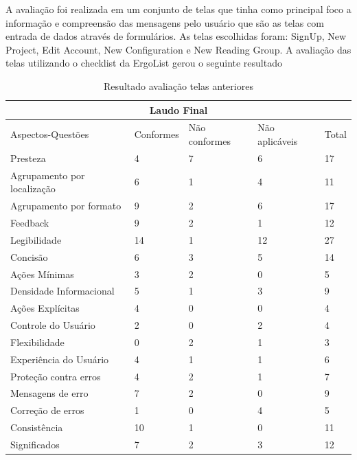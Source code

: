 A avaliação foi realizada em um conjunto de telas que tinha como principal foco a informação e compreensão das mensagens pelo usuário que são as telas com entrada de dados através de formulários. As telas escolhidas foram: SignUp, New Project, Edit Account, New Configuration e New Reading Group. A avaliação das telas utilizando o checklist da ErgoList gerou o seguinte resultado

\begin{table}[H]
\begin{tabular}{|l|l|l|l|l|}
\hline
\multicolumn{5}{c}{\textbf{Laudo Final}}                                         \\ \hline
Aspectos-Questões           & Conformes & Não conformes & Não aplicáveis & Total \\ \hline
Presteza                    & 4         & 7             & 6              & 17    \\ \hline
Agrupamento por localização & 6         & 1             & 4              & 11    \\ \hline
Agrupamento por formato     & 9         & 2             & 6              & 17    \\ \hline
Feedback                    & 9         & 2             & 1              & 12    \\ \hline
Legibilidade                & 14        & 1             & 12             & 27    \\ \hline
Concisão                    & 6         & 3             & 5              & 14    \\ \hline
Ações Mínimas               & 3         & 2             & 0              & 5     \\ \hline
Densidade Informacional     & 5         & 1             & 3              & 9     \\ \hline
Ações Explícitas            & 4         & 0             & 0              & 4     \\ \hline
Controle do Usuário         & 2         & 0             & 2              & 4     \\ \hline
Flexibilidade               & 0         & 2             & 1              & 3     \\ \hline
Experiência do Usuário      & 4         & 1             & 1              & 6     \\ \hline
Proteção contra erros       & 4         & 2             & 1              & 7     \\ \hline
Mensagens de erro           & 7         & 2             & 0              & 9     \\ \hline
Correção de erros           & 1         & 0             & 4              & 5     \\ \hline
Consistência                & 10        & 1             & 0              & 11    \\ \hline
Significados                & 7         & 2             & 3              & 12    \\ \hline
\end{tabular}
\caption{Resultado avaliação telas anteriores}
\end{table}

